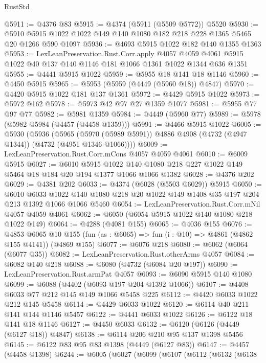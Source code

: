 \begin{lexlean}{RustStd}
\begin{coremodule}
@5911 := @4376 @83
@5915 := @4374 (@5911 (@5509 @5772)) @5520
@5930 := @5910 @5915 @1022 @1022 @149 @140 @1080 @182 @218 @228 @1365 @5465 @20 @1266 @590 @1097
@5936 := @4693 @5915 @1022 @182 @140 @1355 @1363
@5953 := LexLeanPreservation.Rust.Corr.apply
    @4057
    @4059
    @4061
    @5915
    @1022
    @40
    @137
    @140
    @1146
    @181
    @1066
    @1361
    @1022
    @1344
    @636
    @1351
@5955 := @4441 @5915 @1022
@5959 := @5955 @18 @141 @18 @1146
@5960 := @4450 @5915
@5965 := @5953 (@5959 (@4449 (@5960 @18)) @4847)
@5970 := @4420 @5915 @1022 @181 @137 @1361
@5972 := @4429 @5915 @1022
@5973 := @5972 @162
@5978 := @5973 @42 @97 @27 @1359 @1077
@5981 := @5955 @77 @97 @77
@5982 := @5981 @1359
@5984 := @4449 (@5960 @77)
@5989 := @5978 (@5982 @5984 (@4457 (@4458 @1359)))
@5991 := @4466 @5915 @1022
@6005 := @5930
    (@5936
      (@5965 (@5970 (@5989 @5991)) @4886 @4908 (@4732 (@4947 @1344)) (@4732 (@4951 @1346 @1066))))
@6009 := LexLeanPreservation.Rust.Corr.mCons @4057 @4059 @4061
@6010 := @6009 @5915
@6027 := @6010
    @5915
    @1022
    @140
    @1080
    @218
    @227
    @1022
    @149
    @5464
    @18
    @184
    @20
    @194
    @1377
    @1066
    @1066
    @1382
@6028 := @4376 @202
@6029 := @4381 @202
@6033 := @4374 (@6028 (@5503 @6029)) @5915
@6050 := @6010
    @6033
    @1022
    @140
    @1080
    @218
    @20
    @1022
    @149
    @1408
    @35
    @197
    @204
    @213
    @1392
    @1066
    @1066
    @5460
@6054 := LexLeanPreservation.Rust.Corr.mNil @4057 @4059 @4061
@6062 := @6050 (@6054 @5915 @1022 @140 @1080 @218 @1022 @149)
@6064 := @4288 (@4081 @155)
@6065 := @4036 @155
@6076 := @4853
    @6065
    @10
    @155
    (fun (as : @6065) => fun (i : @10) => @4861 (@4862 @155 @4141))
    (@4869 @155)
@6077 := @6076 @218
@6080 := @6062 (@6064 (@6077 @35))
@6082 := LexLeanPreservation.Rust.otherArms @4057
@6084 := @6082 @140 @218
@6088 := @6080 (@4732 (@6084 @20 @197))
@6090 := LexLeanPreservation.Rust.armPat @4057
@6093 := @6090 @5915 @140 @1080
@6099 := @6088 (@4402 (@6093 @197 @204 @1392 @1066))
@6107 := @4408 @6033 @77 @212 @145 @149 @1066 @5458 @225
@6112 := @4420 @6033 @1022 @212 @145 @5458
@6114 := @4429 @6033 @1022
@6120 := @6114 @40 @211 @141 @144 @1146 @5457
@6122 := @4441 @6033 @1022
@6126 := @6122 @18 @141 @18 @1146
@6127 := @4450 @6033
@6132 := @6120 (@6126 (@4449 (@6127 @18)) @4847)
@6138 := @6114 @206 @210 @95 @137 @1398 @5456
@6145 := @6122 @83 @95 @83 @1398 (@4449 (@6127 @83))
@6147 := @4457 (@4458 @1398)
@6244 := @6005
    (@6027
      (@6099
        (@6107
          (@6112
            (@6132
              (@6138

\end{coremodule}
\end{lexlean}
